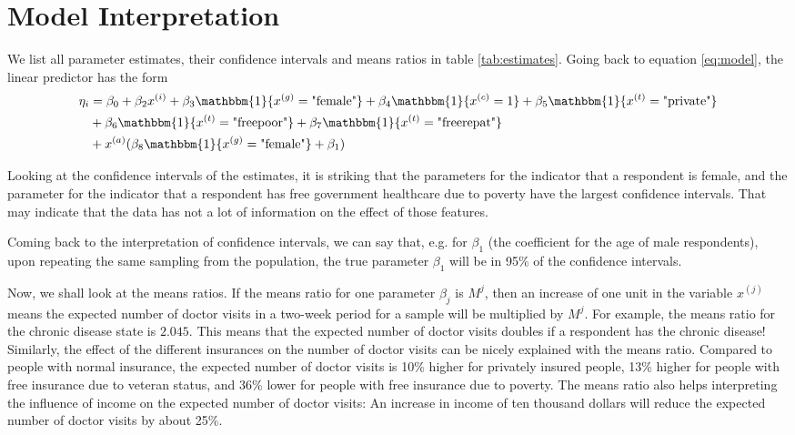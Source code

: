 \documentclass[a4paper,11pt]{article}
\begin{document}
\section{Model Interpretation}

We list all parameter estimates, their confidence intervals and means ratios in table \ref{tab:estimates}. Going back to equation \ref{eq:model}, the linear predictor has the form
\begin{align}
\eta_i &= \beta_0  +  \beta_2 x^{(i)} + \beta_3 \mathbbm{1}\{x^{(g)} = \text{"female"}\}     +\beta_4\mathbbm{1}\{x^{(c)} = 1\}   + 
 \beta_5\mathbbm{1}\{x^{(t)} = \text{"private"}\}    \nonumber\\
 &+  \beta_6\mathbbm{1}\{x^{(t)} = \text{"freepoor"}\}  + \beta_7 \mathbbm{1}\{x^{(t)} = \text{"freerepat"}\}  \\
&+   x^{(a)}(\beta_8 \mathbbm{1}\{x^{(g)} = \text{"female"} \} + \beta_1) \nonumber
\end{align}



Looking at the confidence intervals of the estimates, it is striking that the parameters for the indicator that a respondent is female, and the parameter for the indicator that a respondent has free government healthcare due to poverty have the largest confidence intervals. That may indicate that the data has not a lot of information on the effect of those features.

Coming back to the interpretation of confidence intervals, we can say that, e.g. for $\beta_1$ (the coefficient for the age of male respondents), upon repeating the same sampling from the population, the true parameter $\beta_1$ will be in 95\% of the confidence intervals.

Now, we shall look at the means ratios. If the means ratio for one parameter $\beta_j$ is $M^j$, then an increase of one unit in the variable $x^{(j)}$ means the expected number of doctor visits in a two-week period for a sample will be multiplied by  $M^j$. For example, the means ratio for the chronic disease state is $2.045$. This means that the expected number of doctor visits doubles if a respondent has the chronic disease! Similarly, the effect of the different insurances on the number of doctor visits can be nicely explained with the means ratio. Compared to people with normal insurance, the expected number of doctor visits is 10\% higher for privately insured people, 13\% higher for people with free insurance due to veteran status, and 36\% lower for people with free insurance due to poverty. The means ratio also helps interpreting the influence of income on the expected number of doctor visits: An increase in income of ten thousand dollars will reduce the expected number of doctor visits by about 25\%.
\end{document}
